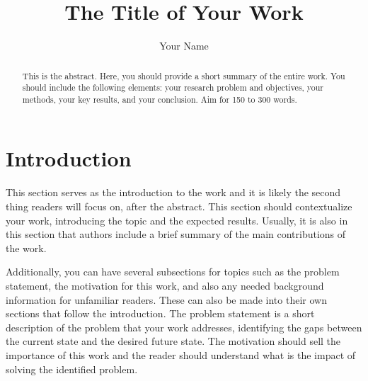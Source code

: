 \documentclass[sigconf,balance,nonacm,authordraft]{acmart}
\begin{document}
\begin{acronym}
\end{acronym}

\title{The Title of Your Work}

\author{Your Name}


\begin{abstract}
This is the abstract. Here, you should provide a short summary of the entire work. You should include the following elements: your research problem and objectives, your methods, your key results, and your conclusion. Aim for 150 to 300 words.
\end{abstract}


\maketitle

\section{Introduction}
\label{sec:intro}
This section serves as the introduction to the work and it is likely the second thing readers will focus on, after the abstract. This section should contextualize your work, introducing the topic and the expected results. Usually, it is also in this section that authors include a brief summary of the main contributions of the work.

Additionally, you can have several subsections for topics such as the problem statement, the motivation for this work, and also any needed background information for unfamiliar readers. These can also be made into their own sections that follow the introduction. The problem statement is a short description of the problem that your work addresses, identifying the gaps between the current state and the desired future state. The motivation should sell the importance of this work and the reader should understand what is the impact of solving the identified problem.

\end{document}
